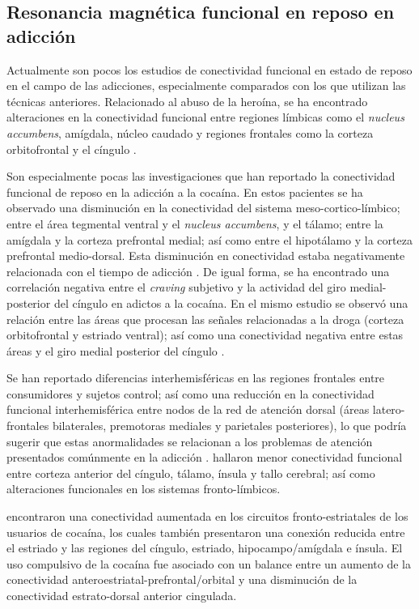 \subsection{Resonancia magnética funcional en reposo en adicción}
Actualmente son pocos los estudios de conectividad funcional en estado de reposo en el campo de las adicciones, especialmente comparados con los que utilizan las técnicas anteriores.
Relacionado al abuso de la heroína, se ha encontrado alteraciones en la conectividad funcional entre regiones límbicas \textemdash{}como el \textit{nucleus accumbens}, amígdala, núcleo caudado\textemdash{} y regiones frontales \textemdash{}como la corteza orbitofrontal y el cíngulo \parencite{Ma2010,Tianye2015,Wang2010,Zhang2016}.\par
Son especialmente pocas las investigaciones que han reportado la conectividad funcional de reposo en la adicción a la cocaína.
En estos pacientes se ha observado una disminución en la conectividad del sistema meso-cortico-límbico; entre el área tegmental ventral y el \textit{nucleus accumbens}, y el tálamo; entre la amígdala y la corteza prefrontal medial; así como entre el hipotálamo y la corteza prefrontal medio-dorsal.
Esta disminución en conectividad estaba negativamente relacionada con el tiempo de adicción \parencite{Gu2010}.
De igual forma, se ha encontrado una correlación negativa entre el \textit{craving} subjetivo y la actividad del giro medial-posterior del cíngulo en adictos a la cocaína.
En el mismo estudio se observó una relación entre las áreas que procesan las señales relacionadas a la droga (corteza orbitofrontal y estriado ventral);
así como una conectividad negativa entre estas áreas y el giro medial posterior del cíngulo \parencite{Wilcox2011}.\par
Se han reportado diferencias interhemisféricas en las regiones frontales entre consumidores y sujetos control;
así como una reducción en la conectividad funcional interhemisférica entre nodos de la red de atención dorsal (áreas latero-frontales bilaterales, premotoras mediales y parietales posteriores), lo que podría sugerir que estas anormalidades se relacionan a los problemas de atención presentados comúnmente en la adicción \parencite{Kelly2011a}.
\textcite{Verdejo-Garcia2014} hallaron menor conectividad funcional entre corteza anterior del cíngulo, tálamo, ínsula y tallo cerebral; así como alteraciones funcionales en los sistemas fronto-límbicos.\par
\textcite{Hu2015} encontraron una conectividad aumentada en los circuitos fronto-estriatales de los usuarios de cocaína, los cuales también presentaron una conexión reducida entre el estriado y las regiones del cíngulo, estriado, hipocampo/amígdala e ínsula. El uso compulsivo de la cocaína fue asociado con un balance entre un aumento de la conectividad anteroestriatal-prefrontal/orbital y una disminución de la conectividad estrato-dorsal anterior cingulada.\par
